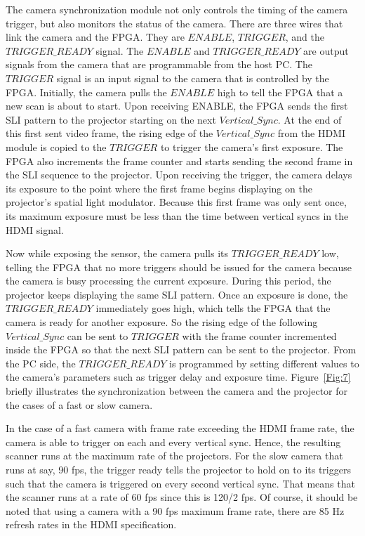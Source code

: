 \documentclass[]{spie}  %
\begin{document}
The camera synchronization module not only controls the timing of the camera trigger, but also monitors the status of the camera. There are three wires that link the camera and the FPGA. They are $ENABLE$, $TRIGGER$, and the $TRIGGER\_READY$ signal. The $ENABLE$ and $TRIGGER\_READY$ are output signals from the camera that are programmable from the host PC. The $TRIGGER$ signal is an input signal to the camera that is controlled by the FPGA. Initially, the camera pulls the $ENABLE$ high to tell the FPGA that a new scan is about to start. Upon receiving ENABLE, the FPGA sends the first SLI pattern to the projector starting on the next $Vertical\_Sync$. At the end of this first sent video frame, the rising edge of the $Vertical\_Sync$ from the HDMI module is copied to the $TRIGGER$ to trigger the camera's first exposure.  The FPGA also increments the frame counter and starts sending the second frame in the SLI sequence to the projector.  Upon receiving the trigger, the camera delays its exposure to the point where the first frame begins displaying on the projector's spatial light modulator.  Because this first frame was only sent once, its maximum exposure must be less than the time between vertical syncs in the HDMI signal. 

Now while exposing the sensor, the camera pulls its $TRIGGER\_READY$ low, telling the FPGA that no more triggers should be issued for the camera because the camera is busy processing the current exposure. During this period, the projector keeps displaying the same SLI pattern. Once an exposure is done, the $TRIGGER\_READY$ immediately goes high,  which tells the FPGA that the camera is ready for another exposure. So the rising edge of the following $Vertical\_Sync$ can be sent to $TRIGGER$ with the frame counter incremented inside the FPGA so that the next SLI pattern can be sent to the projector. From the PC side, the $TRIGGER\_READY$ is programmed by setting different values to the camera's parameters such as trigger delay and exposure time. Figure~\ref{Fig:7} briefly illustrates the synchronization between the camera and the projector for the cases of a fast or slow camera. 

In the case of a fast camera with frame rate exceeding the HDMI frame rate, the camera is able to trigger on each and every vertical sync.  Hence, the resulting scanner runs at the maximum rate of the projectors.  For the slow camera that runs at say, 90 fps, the trigger ready tells the projector to hold on to its triggers such that the camera is triggered on every second vertical sync.  That means that the scanner runs at a rate of 60 fps since this is 120/2 fps. Of course, it should be noted that using a camera with a 90 fps maximum frame rate, there are 85 Hz refresh rates in the HDMI specification.
\end{document}
